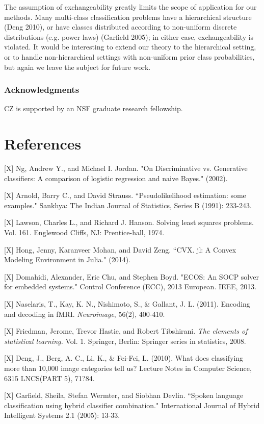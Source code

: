 \documentclass{article}
\begin{document}
The assumption of exchangeability greatly limits the scope of application for our methods.
Many multi-class classification problems
have a hierarchical structure (Deng 2010), or have classes distributed according to
non-uniform discrete distributions (e.g. power laws) (Garfield 2005); in either case, exchangeability is violated.
It would be interesting to extend our theory to the hierarchical setting, or to handle non-hierarchical settings
with non-uniform prior class probabilities, but again we leave the subject for future work.

\subsubsection*{Acknowledgments}

CZ is supported by an NSF graduate research fellowship.

\section*{References}

\small

[X] Ng, Andrew Y., and Michael I. Jordan. "On Discriminative vs. Generative classifiers: A comparison of logistic regression and naive Bayes." (2002).

[X] Arnold, Barry C., and David Strauss. ``Pseudolikelihood estimation: some examples." Sankhya: The Indian Journal of Statistics, Series B (1991): 233-243.

[X] Lawson, Charles L., and Richard J. Hanson. Solving least squares problems. Vol. 161. Englewood Cliffs, NJ: Prentice-hall, 1974.

[X] Hong, Jenny, Karanveer Mohan, and David Zeng. ``CVX. jl: A Convex Modeling Environment in Julia." (2014).

[X] Domahidi, Alexander, Eric Chu, and Stephen Boyd. "ECOS: An SOCP solver for embedded systems." Control Conference (ECC), 2013 European. IEEE, 2013.

[X] Naselaris, T., Kay, K. N., Nishimoto, S., \& Gallant,
J. L. (2011). Encoding and decoding in fMRI. \emph{Neuroimage}, 56(2),
400-410.

[X] Friedman, Jerome, Trevor Hastie, and Robert Tibshirani. \emph{The elements
of statistical learning.} Vol. 1. Springer, Berlin: Springer series in
statistics, 2008.

[X] Deng, J., Berg, A. C., Li, K., \& Fei-Fei, L. (2010). What does classifying more than 10,000 image categories tell us? Lecture Notes in Computer Science, 6315 LNCS(PART 5), 71?84. 

[X] Garfield, Sheila, Stefan Wermter, and Siobhan Devlin. ``Spoken language classification using hybrid classifier combination." International Journal of Hybrid Intelligent Systems 2.1 (2005): 13-33.
\end{document}
